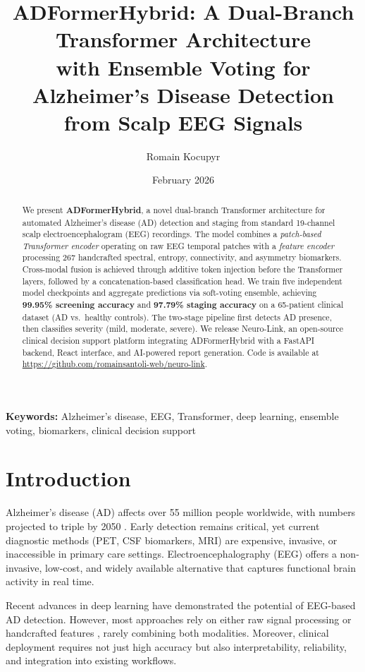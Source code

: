 \documentclass[twocolumn,11pt]{article}
\title{%
  \textbf{ADFormerHybrid: A Dual-Branch Transformer Architecture \\
  with Ensemble Voting for Alzheimer's Disease Detection \\
  from Scalp EEG Signals}
}
\author[1]{Romain Kocupyr}
\affil[1]{Independent Researcher — Neuro-Link Project}
\date{February 2026}
\begin{document}
\maketitle

\begin{abstract}
We present \textbf{ADFormerHybrid}, a novel dual-branch Transformer architecture for automated Alzheimer's disease (AD) detection and staging from standard 19-channel scalp electroencephalogram (EEG) recordings. The model combines a \textit{patch-based Transformer encoder} operating on raw EEG temporal patches with a \textit{feature encoder} processing 267 handcrafted spectral, entropy, connectivity, and asymmetry biomarkers. Cross-modal fusion is achieved through additive token injection before the Transformer layers, followed by a concatenation-based classification head. We train five independent model checkpoints and aggregate predictions via soft-voting ensemble, achieving \textbf{99.95\% screening accuracy} and \textbf{97.79\% staging accuracy} on a 65-patient clinical dataset (AD vs.\ healthy controls). The two-stage pipeline first detects AD presence, then classifies severity (mild, moderate, severe). We release Neuro-Link, an open-source clinical decision support platform integrating ADFormerHybrid with a FastAPI backend, React interface, and AI-powered report generation. Code is available at \url{https://github.com/romainsantoli-web/neuro-link}.
\end{abstract}

\noindent\textbf{Keywords:} Alzheimer's disease, EEG, Transformer, deep learning, ensemble voting, biomarkers, clinical decision support

\section{Introduction}

Alzheimer's disease (AD) affects over 55 million people worldwide, with numbers projected to triple by 2050 \cite{who2023}. Early detection remains critical, yet current diagnostic methods (PET, CSF biomarkers, MRI) are expensive, invasive, or inaccessible in primary care settings. Electroencephalography (EEG) offers a non-invasive, low-cost, and widely available alternative that captures functional brain activity in real time.

Recent advances in deep learning have demonstrated the potential of EEG-based AD detection. However, most approaches rely on either raw signal processing \cite{ieracitano2020} or handcrafted features \cite{dauwels2010}, rarely combining both modalities. Moreover, clinical deployment requires not just high accuracy but also interpretability, reliability, and integration into existing workflows.
\end{document}

